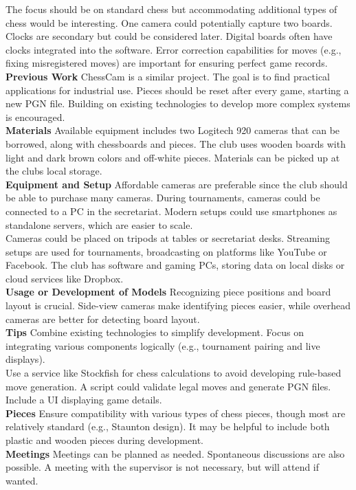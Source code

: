 The focus should be on standard chess but accommodating additional types of chess would be interesting. One camera could potentially capture two boards. Clocks are secondary but could be considered later. Digital boards often have clocks integrated into the software. Error correction capabilities for moves (e.g., fixing misregistered moves) are important for ensuring perfect game records.\\

\textbf{Previous Work} 
ChessCam is a similar project. The goal is to find practical applications for industrial use. Pieces should be reset after every game, starting a new PGN file. Building on existing technologies to develop more complex systems is encouraged.\\


\textbf{Materials} 
Available equipment includes two Logitech 920 cameras that can be borrowed, along with chessboards and pieces. The club uses wooden boards with light and dark brown colors and off-white pieces. Materials can be picked up at the clubs local storage. \\


\textbf{Equipment and Setup} 
Affordable cameras are preferable since the club should be able to purchase many cameras. During tournaments, cameras could be connected to a PC in the secretariat. Modern setups could use smartphones as standalone servers, which are easier to scale.\\

Cameras could be placed on tripods at tables or secretariat desks. Streaming setups are used for tournaments, broadcasting on platforms like YouTube or Facebook. The club has software and gaming PCs, storing data on local disks or cloud services like Dropbox.\\

\textbf{Usage or Development of Models} 
Recognizing piece positions and board layout is crucial. Side-view cameras make identifying pieces easier, while overhead cameras are better for detecting board layout.\\

\textbf{Tips} 
Combine existing technologies to simplify development. Focus on integrating various components logically (e.g., tournament pairing and live displays). \\

Use a service like Stockfish for chess calculations to avoid developing rule-based move generation. A script could validate legal moves and generate PGN files. Include a UI displaying game details.\\

\textbf{Pieces} 
Ensure compatibility with various types of chess pieces, though most are relatively standard (e.g., Staunton design). It may be helpful to include both plastic and wooden pieces during development. \\

\textbf{Meetings} 
Meetings can be planned as needed. Spontaneous discussions are also possible. A meeting with the supervisor is not necessary, but will attend if wanted. 